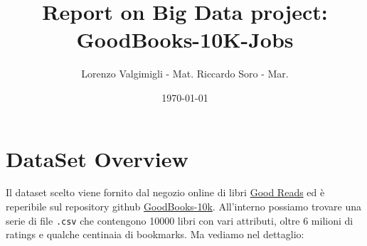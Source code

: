 \documentclass[11pt]{article}
\title{\textbf{Report on Big Data project: GoodBooks-10K-Jobs}}
\author{
Lorenzo Valgimigli - Mat.
Riccardo Soro - Mar. }
\date{\today}
\begin{document}
\maketitle

\newpage

\tableofcontents

\newpage

\section{DataSet Overview}

Il dataset scelto viene fornito dal negozio online di libri \href{https://www.goodreads.com/}{Good Reads} ed è
reperibile sul repository github \href{https://github.com/zygmuntz/goodbooks-10k}{GoodBooks-10k}.
All'interno possiamo trovare una serie di file \texttt{.csv} che contengono 10000 libri con vari attributi,
oltre 6 milioni di ratings e qualche centinaia di bookmarks. Ma vediamo nel dettaglio:
\end{document}
